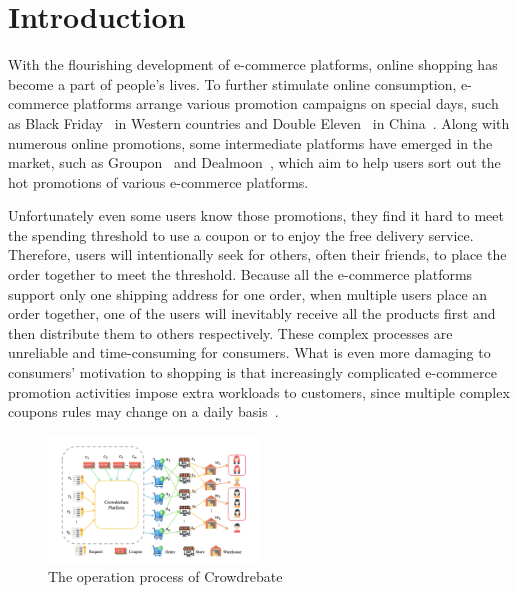 \section{Introduction}

With the flourishing development of e-commerce platforms, online shopping has become a part of people's lives. To further stimulate online consumption, e-commerce platforms arrange various promotion campaigns on special days, such as Black Friday~\cite{2013Black} in Western countries and Double Eleven~\cite{double11} in China~\cite{huang2019x}. Along with numerous online promotions, some intermediate platforms have emerged in the market, such as Groupon~\cite{groupon} and Dealmoon~\cite{dealmoon}, which aim to help users sort out the hot promotions of various e-commerce platforms.

Unfortunately even some users know those promotions, they find it hard to meet the spending threshold to use a coupon or to enjoy the free delivery service. Therefore, users will intentionally seek for others, often their friends, to place the order together to meet the threshold. Because all the e-commerce platforms support only one shipping address for one order, when multiple users place an order together, one of the users will inevitably receive all the products first and then distribute them to others respectively. These complex processes are unreliable and time-consuming for consumers. What is even more damaging to consumers' motivation to shopping is that increasingly complicated e-commerce promotion activities impose extra workloads to customers, since multiple complex coupons rules may change on a daily basis~\cite{double2020}.
\begin{figure}[t]\vspace{-2ex} 
\centering %
		\includegraphics[width=0.5\textwidth]{../figure/crowdrebate process.png} %
	\caption{The operation process of Crowdrebate} %
	\label{fig:Crowdrebate} %
	\vspace{-2ex}
	\end{figure}

